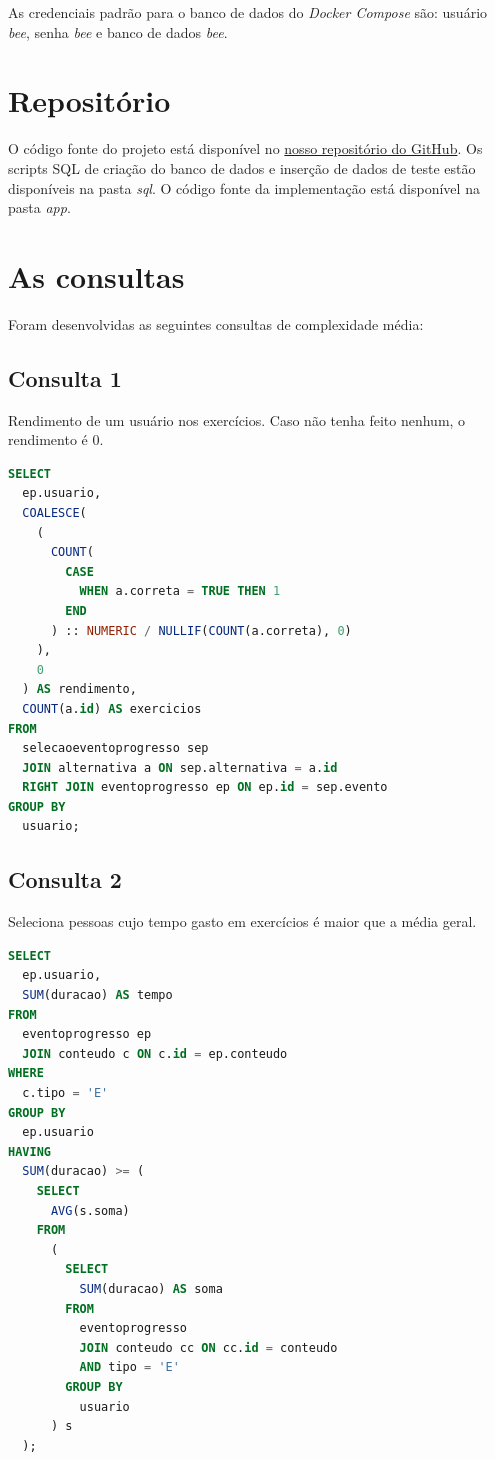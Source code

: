 As credenciais padrão para o banco de dados do \textit{Docker Compose} são: usuário 
\textit{bee}, senha \textit{bee} e banco de dados \textit{bee}.

\section{Repositório}

O código fonte do projeto está disponível no \href{https://github.com/Capivaras-Digitais/database-design-project}{nosso repositório do GitHub}. Os scripts SQL de criação do banco de dados e inserção de dados de teste estão disponíveis na pasta \textit{sql}. O código fonte da implementação está disponível na pasta \textit{app}.

\section{As consultas}

Foram desenvolvidas as seguintes consultas de complexidade média:

\subsection{Consulta 1}

Rendimento de um usuário nos exercícios. Caso não tenha feito nenhum, o rendimento é 0.

\begin{lstlisting}[language=SQL,caption={Consulta 1},label={lst:consulta1}]
SELECT
  ep.usuario,
  COALESCE(
    (
      COUNT(
        CASE
          WHEN a.correta = TRUE THEN 1
        END
      ) :: NUMERIC / NULLIF(COUNT(a.correta), 0)
    ),
    0
  ) AS rendimento,
  COUNT(a.id) AS exercicios
FROM
  selecaoeventoprogresso sep
  JOIN alternativa a ON sep.alternativa = a.id
  RIGHT JOIN eventoprogresso ep ON ep.id = sep.evento
GROUP BY
  usuario;
\end{lstlisting}

\subsection{Consulta 2}

Seleciona pessoas cujo tempo gasto em exercícios é maior que a média geral.

\begin{lstlisting}[language=SQL,caption={Consulta 2},label={lst:consulta2}]
SELECT
  ep.usuario,
  SUM(duracao) AS tempo
FROM
  eventoprogresso ep
  JOIN conteudo c ON c.id = ep.conteudo
WHERE
  c.tipo = 'E'
GROUP BY
  ep.usuario
HAVING
  SUM(duracao) >= (
    SELECT
      AVG(s.soma)
    FROM
      (
        SELECT
          SUM(duracao) AS soma
        FROM
          eventoprogresso
          JOIN conteudo cc ON cc.id = conteudo
          AND tipo = 'E'
        GROUP BY
          usuario
      ) s
  );
\end{lstlisting}

